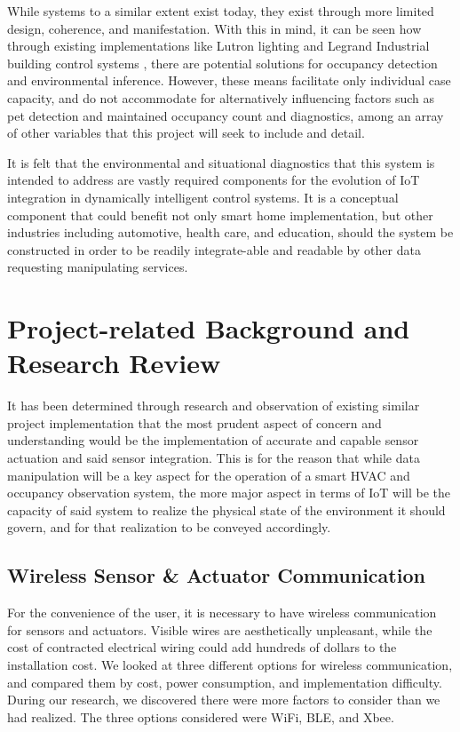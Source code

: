 \documentclass{article}
\begin{document}
While systems to a similar extent exist today, they exist through more limited design, coherence, and manifestation. With this in mind, it can be seen how through existing implementations like Lutron lighting \cite{r1} and Legrand Industrial building control systems \cite{r2}, there are potential solutions for occupancy detection and environmental inference. However, these means facilitate only individual case capacity, and do not accommodate for alternatively influencing factors such as pet detection and maintained occupancy count and diagnostics, among an array of other variables that this project will seek to include and detail.

It is felt that the environmental and situational diagnostics that this system is intended to address are vastly required components for the evolution of \gls{IoT} integration in dynamically intelligent control systems. It is a conceptual component that could benefit not only smart home implementation, but other industries including automotive, health care, and education, should the system be constructed in order to be readily integrate-able and readable by other data requesting manipulating services. 

\pagebreak
\section{Project-related Background and Research Review}

It has been determined through research and observation of existing similar project implementation that the most prudent aspect of concern and understanding would be the implementation of accurate and capable sensor actuation and said sensor integration. This is for the reason that while data manipulation will be a key aspect for the operation of a smart HVAC and occupancy observation system, the more major aspect in terms of \gls{IoT} will be the capacity of said system to realize the physical state of the environment it should govern, and for that realization to be conveyed accordingly.  

\subsection{Wireless Sensor \& Actuator Communication}

For the convenience of the user, it is necessary to have wireless communication for sensors and actuators.
Visible wires are aesthetically unpleasant, while the cost of contracted electrical wiring could add hundreds of dollars to the installation cost. We looked at three different options for wireless communication, and compared them by cost, power consumption, and implementation difficulty. During our research, we discovered there were more factors to consider than we had realized. The three options considered were WiFi, \gls{BLE}, and Xbee.
\end{document}

